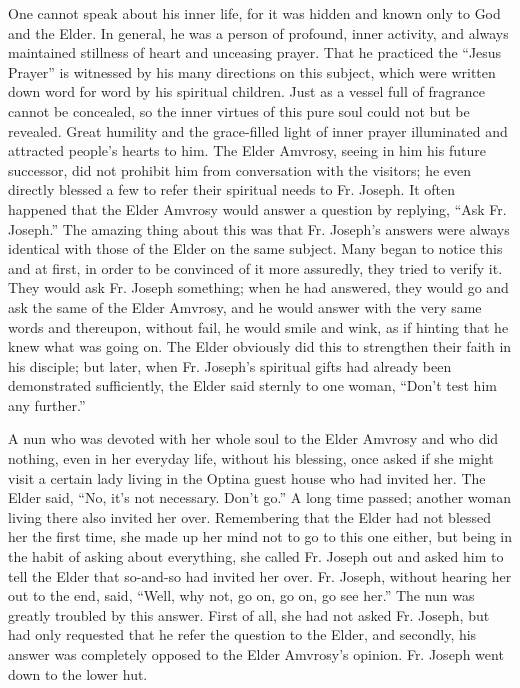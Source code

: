 One cannot speak about his inner life, for it was hidden and known only to God and the Elder. In general, he was a person of profound, inner activity, and always maintained stillness of heart and unceasing prayer. That he practiced the “Jesus Prayer” is witnessed by his many directions on this subject, which were written down word for word by his spiritual children. Just as a vessel full of fragrance cannot be concealed, so the inner virtues of this pure soul could not but be revealed. Great humility and the grace-filled light of inner prayer illuminated and attracted people's hearts to him. The Elder Amvrosy, seeing in him his future successor, did not prohibit him from conversation with the visitors; he even directly blessed a few to refer their spiritual needs to Fr. Joseph. It often happened that the Elder Amvrosy would answer a question by replying, “Ask Fr. Joseph.” The amazing thing about this was that Fr. Joseph's answers were always identical with those of the Elder on the same subject. Many began to notice this and at first, in order to be convinced of it more assuredly, they tried to verify it. They would ask Fr. Joseph something; when he had answered, they would go and ask the same of the Elder Amvrosy, and he would answer with the very same words and thereupon, without fail, he would smile and wink, as if hinting that he knew what was going on. The Elder obviously did this to strengthen their faith in his disciple; but later, when Fr. Joseph's spiritual gifts had already been demonstrated sufficiently, the Elder said sternly to one woman, “Don't test him any further.”

A nun who was devoted with her whole soul to the Elder Amvrosy and who did nothing, even in her everyday life, without his blessing, once asked if she might visit a certain lady living in the Optina guest house who had invited her. The Elder said, “No, it's not necessary. Don't go.” A long time passed; another woman living there also invited her over. Remembering that the Elder had not blessed her the first time, she made up her mind not to go to this one either, but being in the habit of asking about everything, she called Fr. Joseph out and asked him to tell the Elder that so-and-so had invited her over. Fr. Joseph, without hearing her out to the end, said, “Well, why not, go on, go on, go see her.” The nun was greatly troubled by this answer. First of all, she had not asked Fr. Joseph, but had only requested that he refer the question to the Elder, and secondly, his answer was completely opposed to the Elder Amvrosy's opinion. Fr. Joseph went down to the lower hut.

